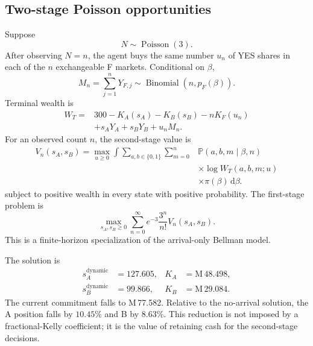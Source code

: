 \documentclass[journal,a4paper]{IEEEtran}
\newcommand{\Prb}{\mathbb{P}}
\begin{document}
\subsection{Two-stage Poisson opportunities}
Suppose
\begin{equation}
N\sim\operatorname{Poisson}(3).
\end{equation}
After observing $N=n$, the agent buys the same number $u_n$ of YES shares in each of the $n$ exchangeable F markets. Conditional on $\beta$,
\begin{equation}
M_n=\sum_{j=1}^{n}Y_{F,j}
\sim
\operatorname{Binomial}(n,p_F(\beta)).
\end{equation}
Terminal wealth is
\begin{equation}
\begin{split}
W_T={}&300-K_A(s_A)-K_B(s_B)-nK_F(u_n)\\
&+s_AY_A+s_BY_B+u_nM_n.
\end{split}
\label{eq:example-terminal}
\end{equation}
For an observed count $n$, the second-stage value is
\begin{equation}
\begin{split}
V_n(s_A,s_B)
=\max_{u\geq0}\int
\sum_{a,b\in\{0,1\}}
\sum_{m=0}^{n}
&\Prb(a,b,m\mid\beta,n)\\
&\times\log W_T(a,b,m;u)\\
&\times\pi(\beta)\,\mathrm{d}\beta.
\end{split}
\label{eq:stage-two}
\end{equation}
subject to positive wealth in every state with positive probability. The first-stage problem is
\begin{equation}
\max_{s_A,s_B\geq0}
\sum_{n=0}^{\infty}
e^{-3}\frac{3^n}{n!}V_n(s_A,s_B).
\label{eq:stage-one}
\end{equation}
This is a finite-horizon specialization of the arrival-only Bellman model.

The solution is
\begin{align}
s_A^{\mathrm{dynamic}}&=127.605,
&K_A&=\text{M}\,48.498,\\
s_B^{\mathrm{dynamic}}&=99.866,
&K_B&=\text{M}\,29.084.
\end{align}
The current commitment falls to M\,77.582. Relative to the no-arrival solution, the A position falls by $10.45\%$ and B by $8.63\%$. This reduction is not imposed by a fractional-Kelly coefficient; it is the value of retaining cash for the second-stage decisions.
\end{document}

